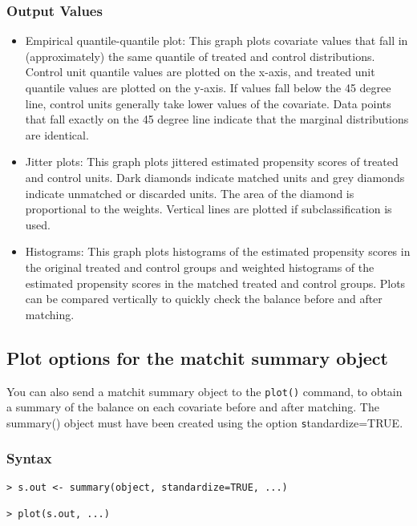 \subsubsection{Output Values}

\begin{itemize}
\item Empirical quantile-quantile plot: This graph plots covariate
  values that fall in (approximately) the same quantile of treated and
  control distributions.  Control unit quantile values are plotted on
  the x-axis, and treated unit quantile values are plotted on the
  y-axis.  If values fall below the 45 degree line, control units
  generally take lower values of the covariate.  Data points that fall
  exactly on the 45 degree line indicate that the marginal
  distributions are identical.
  
\item Jitter plots: This graph plots jittered estimated propensity
  scores of treated and control units.  Dark diamonds indicate matched
  units and grey diamonds indicate unmatched or discarded units.  The
  area of the diamond is proportional to the weights. Vertical lines
  are plotted if subclassification is used.

\item Histograms: This graph plots histograms of the estimated propensity 
scores in the original treated and control groups and weighted histograms of the estimated
propensity scores in the matched treated and control groups.  Plots can be compared vertically to
quickly check the balance before and after matching.  

\end{itemize}

\subsection{Plot options for the matchit summary object}
You can also send a matchit summary object to the \texttt{plot()} command, to obtain
a summary of the balance on each covariate before and after matching.  The summary() object
must have been created using the option {\texttt standardize=TRUE}.  

\subsubsection{Syntax}

\begin{verbatim}
> s.out <- summary(object, standardize=TRUE, ...)

> plot(s.out, ...)
\end{verbatim}

